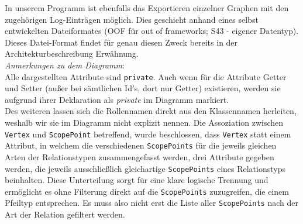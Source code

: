 \documentclass[enabledeprecatedfontcommands,fontsize=11pt,paper=a4,twoside]{scrartcl}
\newcounter{one}
\begin{document}
In unserem Programm ist ebenfalls das Exportieren einzelner Graphen mit den zugehörigen Log-Einträgen möglich. Dies geschieht anhand eines selbst entwickelten Dateiformates (OOF für \glqq out of frameworks\grqq; S43 - eigener Datentyp). Dieses Datei-Format findet für genau diesen Zweck bereits in der Architekturbeschreibung Erwähnung.  \\



\textit{Anmerkungen zu dem Diagramm}: \\
Alle dargestellten Attribute sind \texttt{private}. Auch wenn für die Attribute Getter und Setter (außer bei sämtlichen Id's, dort nur Getter) existieren, werden sie aufgrund ihrer Deklaration als \textit{private} im Diagramm markiert. \\
Des weiteren lassen sich die Rollennamen direkt aus den Klassennamen herleiten, weshalb wir sie im Diagramm nicht explizit nennen. Die Assoziation zwischen \texttt{Vertex} und \texttt{ScopePoint} betreffend, wurde beschlossen, dass \texttt{Vertex} statt einem Attribut, in welchem die verschiedenen \texttt{ScopePoints} für die jeweils gleichen Arten der Relationstypen zusammengefasst werden, drei Attribute gegeben werden, die jeweils ausschließlich gleichartige \texttt{ScopePoints} eines Relationstyps beinhalten. Diese Unterteilung sorgt für eine klare logische Trennung und ermöglicht es ohne Filterung direkt auf die \texttt{ScopePoints} zuzugreifen, die einem Pfeiltyp entsprechen. Es muss also nicht erst die Liste aller \texttt{ScopePoints} nach der Art der Relation gefiltert werden.\\



\end{document}
